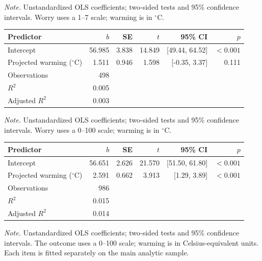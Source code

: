 \documentclass[11pt,a4paper]{article}
\begin{document}
\par\smallskip
{\footnotesize\textit{Note.} Unstandardized OLS coefficients; two-sided tests and 95\% confidence intervals. Worry uses a 1--7 scale; warming is in $^\circ$C.\par}
\endgroup\bigskip
{}\label{tab:7}
\begingroup\small
\begin{tabularx}{\textwidth}{@{}Xrrrrr@{}}
\toprule
Predictor & $b$ & SE & $t$ & 95\% CI & $p$ \\
\midrule
Intercept & 56.985 & 3.838 & 14.849 & [49.44, 64.52] & $<0.001$ \\
Projected warming ($^\circ$C) & 1.511 & 0.946 & 1.598 & [-0.35, 3.37] & 0.111 \\
Observations & 498 &  &  &  &  \\
$R^2$ & 0.005 &  &  &  &  \\
Adjusted $R^2$ & 0.003 &  &  &  &  \\
\bottomrule\end{tabularx}
\par\smallskip
{\footnotesize\textit{Note.} Unstandardized OLS coefficients; two-sided tests and 95\% confidence intervals. Worry uses a 0--100 scale; warming is in $^\circ$C.\par}
\endgroup\bigskip
\clearpage
{}\label{tab:8}
\begingroup\small
\begin{tabularx}{\textwidth}{@{}Xrrrrr@{}}
\toprule
Predictor & $b$ & SE & $t$ & 95\% CI & $p$ \\
\midrule
Intercept & 56.651 & 2.626 & 21.570 & [51.50, 61.80] & $<0.001$ \\
Projected warming ($^\circ$C) & 2.591 & 0.662 & 3.913 & [1.29, 3.89] & $<0.001$ \\
Observations & 986 &  &  &  &  \\
$R^2$ & 0.015 &  &  &  &  \\
Adjusted $R^2$ & 0.014 &  &  &  &  \\
\bottomrule\end{tabularx}
\par\smallskip
{\footnotesize\textit{Note.} Unstandardized OLS coefficients; two-sided tests and 95\% confidence intervals. The outcome uses a 0--100 scale; warming is in Celsius-equivalent units. Each item is fitted separately on the main analytic sample.\par}
\endgroup\bigskip
{}\label{tab:9}
\end{document}
